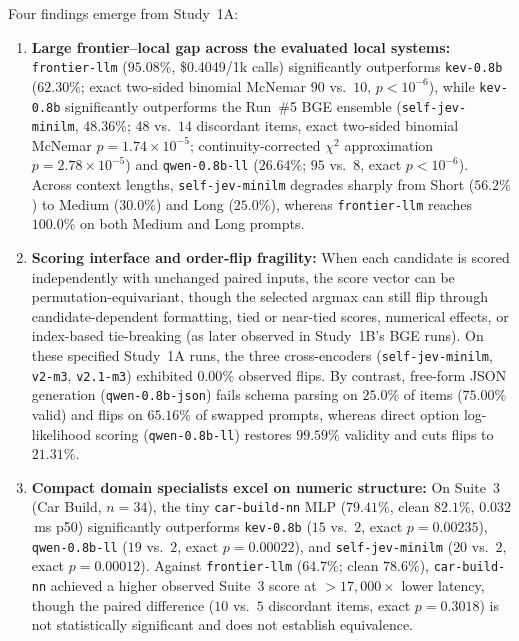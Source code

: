\documentclass[11pt,a4paper]{article}
\begin{document}
Four findings emerge from Study~1A:
\begin{enumerate}[leftmargin=1.5em,itemsep=2pt]
  \item \textbf{Large frontier--local gap across the evaluated local systems:} \texttt{frontier-llm} ($95.08\%$, \$0.4049/1k calls) significantly outperforms \texttt{kev-0.8b} ($62.30\%$; exact two-sided binomial McNemar $90$ vs.\ $10$, $p < 10^{-6}$), while \texttt{kev-0.8b} significantly outperforms the Run~\#5 BGE ensemble (\texttt{self-jev-minilm}, $48.36\%$; $48$ vs.\ $14$ discordant items, exact two-sided binomial McNemar $p = 1.74\times 10^{-5}$; continuity-corrected $\chi^2$ approximation $p = 2.78\times 10^{-5}$) and \texttt{qwen-0.8b-ll} ($26.64\%$; $95$ vs.\ $8$, exact $p < 10^{-6}$). Across context lengths, \texttt{self-jev-minilm} degrades sharply from Short ($56.2\%$) to Medium ($30.0\%$) and Long ($25.0\%$), whereas \texttt{frontier-llm} reaches $100.0\%$ on both Medium and Long prompts.
  \item \textbf{Scoring interface and order-flip fragility:} When each candidate is scored independently with unchanged paired inputs, the score vector can be permutation-equivariant, though the selected argmax can still flip through candidate-dependent formatting, tied or near-tied scores, numerical effects, or index-based tie-breaking (as later observed in Study~1B's BGE runs). On these specified Study~1A runs, the three cross-encoders (\texttt{self-jev-minilm}, \texttt{v2-m3}, \texttt{v2.1-m3}) exhibited $0.00\%$ observed flips. By contrast, free-form JSON generation (\texttt{qwen-0.8b-json}) fails schema parsing on $25.0\%$ of items ($75.00\%$ valid) and flips on $65.16\%$ of swapped prompts, whereas direct option log-likelihood scoring (\texttt{qwen-0.8b-ll}) restores $99.59\%$ validity and cuts flips to $21.31\%$.
  \item \textbf{Compact domain specialists excel on numeric structure:} On Suite~3 (Car Build, $n=34$), the tiny \texttt{car-build-nn} MLP ($79.41\%$, clean $82.1\%$, $0.032$\,ms p50) significantly outperforms \texttt{kev-0.8b} ($15$ vs.\ $2$, exact $p = 0.00235$), \texttt{qwen-0.8b-ll} ($19$ vs.\ $2$, exact $p = 0.00022$), and \texttt{self-jev-minilm} ($20$ vs.\ $2$, exact $p = 0.00012$). Against \texttt{frontier-llm} ($64.7\%$; clean $78.6\%$), \texttt{car-build-nn} achieved a higher observed Suite~3 score at $>17{,}000\times$ lower latency, though the paired difference ($10$ vs.\ $5$ discordant items, exact $p = 0.3018$) is not statistically significant and does not establish equivalence.

\end{enumerate}
\end{document}

